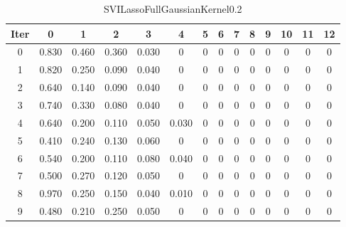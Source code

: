 \begin{table}
	\begin{center}
		\begin{tabular}{|c|c|c|c|c|c|c|c|c|c|c|c|c|c|}
			\hline
			Iter & 0 & 1 & 2 & 3 & 4 & 5 & 6 & 7 & 8 & 9 & 10 & 11 & 12 \\
			\hline
			0 & 0.830 & 0.460 & 0.360 & 0.030 & 0 & 0 & 0 & 0 & 0 & 0 & 0 & 0 & 0 \\
			\hline
			1 & 0.820 & 0.250 & 0.090 & 0.040 & 0 & 0 & 0 & 0 & 0 & 0 & 0 & 0 & 0 \\
			\hline
			2 & 0.640 & 0.140 & 0.090 & 0.040 & 0 & 0 & 0 & 0 & 0 & 0 & 0 & 0 & 0 \\
			\hline
			3 & 0.740 & 0.330 & 0.080 & 0.040 & 0 & 0 & 0 & 0 & 0 & 0 & 0 & 0 & 0 \\
			\hline
			4 & 0.640 & 0.200 & 0.110 & 0.050 & 0.030 & 0 & 0 & 0 & 0 & 0 & 0 & 0 & 0 \\
			\hline
			5 & 0.410 & 0.240 & 0.130 & 0.060 & 0 & 0 & 0 & 0 & 0 & 0 & 0 & 0 & 0 \\
			\hline
			6 & 0.540 & 0.200 & 0.110 & 0.080 & 0.040 & 0 & 0 & 0 & 0 & 0 & 0 & 0 & 0 \\
			\hline
			7 & 0.500 & 0.270 & 0.120 & 0.050 & 0 & 0 & 0 & 0 & 0 & 0 & 0 & 0 & 0 \\
			\hline
			8 & 0.970 & 0.250 & 0.150 & 0.040 & 0.010 & 0 & 0 & 0 & 0 & 0 & 0 & 0 & 0 \\
			\hline
			9 & 0.480 & 0.210 & 0.250 & 0.050 & 0 & 0 & 0 & 0 & 0 & 0 & 0 & 0 & 0 \\
			\hline
		\end{tabular}
	\end{center}
	\caption{SVILassoFullGaussianKernel0.2}
\end{table}